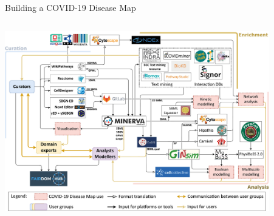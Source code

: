 \documentclass[compress,ignorenonframetext,aspectratio=1610,handout]{beamer}
\begin{document}
\begin{frame}{Building a COVID-19 Disease Map}
	\begin{columns}
		\begin{column}{0.6\textwidth}
			\centering
			\includegraphics[width=0.9\textwidth]{figs/methods/covid19-diseasemap-consrtium.jpg}

		\end{column}

		\pause

		\begin{column}{0.4\textwidth}

		\end{column}

	\end{columns}

\end{frame}
\end{document}
